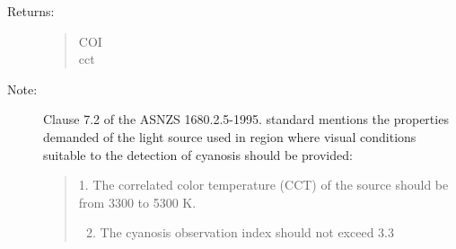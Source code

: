 \documentclass[letterpaper,10pt,english]{sphinxmanual}
\begin{document}
\begin{fulllineitems}
\begin{description}
\begin{quote}
\begin{description}
\end{description}\end{quote}

\item[{Returns:}] \leavevmode\begin{quote}\begin{description}
\item[{COI}] \leavevmode
{}

\item[{cct}] \leavevmode
{}

\end{description}\end{quote}

\item[{Note:}] \leavevmode
Clause 7.2 of the ASNZS 1680.2.5-1995. standard mentions the properties
demanded of the light source used in region where visual conditions 
suitable to the detection of cyanosis should be provided:
\begin{quote}

1. The correlated color temperature (CCT) of the source should be from 
3300 to 5300 K.
\begin{enumerate}
\setcounter{enumi}{1}
\item {} 
The cyanosis observation index should not exceed 3.3

\end{enumerate}
\end{quote}

\end{description}

\end{fulllineitems}

\end{document}
